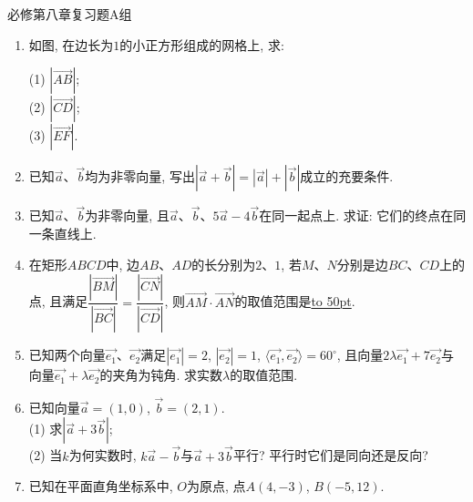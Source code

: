 \documentclass[10pt,a4paper]{article}
\newcommand{\blank}[1]{\underline{\hbox to #1pt{}}}
\begin{document}
必修第八章复习题A组

\begin{enumerate}
\item 如图, 在边长为$1$的小正方形组成的网格上, 求:
\begin{center}
\end{center}
(1) $|\overrightarrow{AB}|$;\\
(2) $|\overrightarrow{CD}|$;\\
(3) $|\overrightarrow{EF}|$.
\item 已知$\overrightarrow a$、$\overrightarrow b$均为非零向量, 写出$|\overrightarrow a+\overrightarrow b|=|\overrightarrow a|+|\overrightarrow b|$成立的充要条件.
\item 已知$\overrightarrow a$、$\overrightarrow b$为非零向量, 且$\overrightarrow a$、$\overrightarrow b$、$5\overrightarrow a-4\overrightarrow b$在同一起点上. 求证: 它们的终点在同一条直线上.
\item 在矩形$ABCD$中, 边$AB$、$AD$的长分别为$2$、$1$, 若$M$、$N$分别是边$BC$、$CD$上的点, 且满足$\dfrac{|\overrightarrow{BM}|}{|\overrightarrow{BC}|}=\dfrac{|\overrightarrow{CN}|}{|\overrightarrow{CD}|}$, 则$\overrightarrow{AM}\cdot \overrightarrow{AN}$的取值范围是\blank{50}.
\item 已知两个向量$\overrightarrow {e_1}$、$\overrightarrow {e_2}$满足$|\overrightarrow {e_1}|=2$, $|\overrightarrow {e_2}|=1$, $\langle \overrightarrow {e_1}, \overrightarrow {e_2}\rangle=60^\circ$, 且向量$2\lambda \overrightarrow {e_1}+7\overrightarrow {e_2}$与向量$\overrightarrow {e_1}+\lambda \overrightarrow {e_2}$的夹角为钝角. 求实数$\lambda$的取值范围.
\item 已知向量$\overrightarrow a=(1, 0)$, $\overrightarrow b=(2, 1)$.\\
(1) 求$|\overrightarrow a+3\overrightarrow b|$;\\
(2) 当$k$为何实数时, $k\overrightarrow a-\overrightarrow b$与$\overrightarrow a+3\overrightarrow b$平行? 平行时它们是同向还是反向?
\item 已知在平面直角坐标系中, $O$为原点, 点$A(4, -3)$, $B(-5, 12)$.\\

\end{enumerate}
\end{document}
